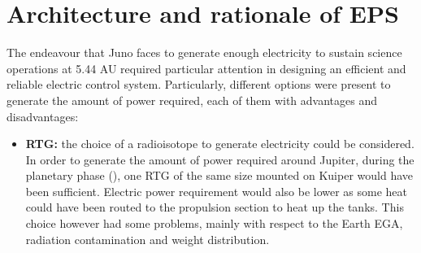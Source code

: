 \section{Architecture and rationale of EPS}
\label{sec:EPS_architecture_rationale}

The endeavour that Juno faces to generate enough electricity to sustain science operations at 5.44 AU required particular attention in designing an efficient and reliable electric control system. Particularly, different options were present to generate the amount of power required, each of them with advantages and disadvantages:

\begin{itemize}
    \item \textbf{RTG:} the choice of a radioisotope to generate electricity could be considered. In order to generate the amount of power required around Jupiter, during the planetary phase (\mref), one RTG of the same size mounted on Kuiper would have been sufficient. Electric power requirement would also be lower as some heat could have been routed to the propulsion section to heat up the tanks. This choice however had some problems, mainly with respect to the Earth EGA, radiation contamination and weight distribution. 
\end{itemize}
